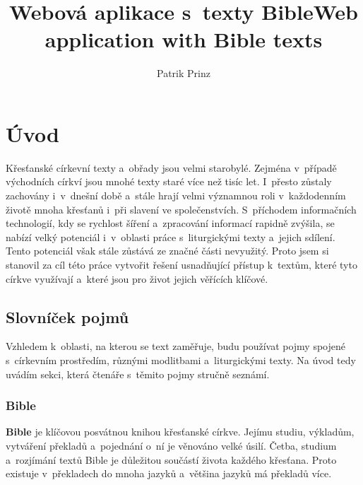 \documentclass[
  tables=false,
  glossaries,
  index
]{kidiplom}
\title{Webová aplikace s~texty Bible}
\title[english]{Web application with Bible texts}
\author{Patrik Prinz}
\begin{document}
\maketitle



\newcommand{\BibLaTeX}{\textsc{Bib}\LaTeX}


\section{Úvod}
Křesťanské církevní texty a~obřady jsou velmi starobylé. Zejména v~případě východních církví jsou mnohé texty staré více než tisíc let. I~přesto zůstaly zachovány i~v~dnešní době a~stále hrají velmi významnou roli v~každodenním životě mnoha křesťanů i~při slavení ve společenstvích. S~příchodem informačních technologií, kdy se rychlost šíření a~zpracování informací rapidně zvýšila, se nabízí velký potenciál i~v~oblasti práce s~liturgickými texty a~jejich sdílení. Tento potenciál však stále zůstává ze značné části nevyužitý. Proto jsem si stanovil za cíl této práce vytvořit řešení usnadňující přístup k~textům, které tyto církve využívají a~které jsou pro život jejich věřících klíčové.

\subsection{Slovníček pojmů}
Vzhledem k~oblasti, na kterou se text zaměřuje, budu používat pojmy spojené s~církevním prostředím, různými modlitbami a~liturgickými texty. Na úvod tedy uvádím sekci, která čtenáře s~těmito pojmy stručně seznámí.

\subsubsection{Bible}
\textbf{Bible} je klíčovou posvátnou knihou křesťanské církve. Jejímu studiu, výkladům, vytváření překladů a~pojednání o~ní je věnováno velké úsilí. Četba, studium a~rozjímání textů Bible je důležitou součástí života každého křesťana. Proto existuje v~překladech do mnoha jazyků a~většina jazyků má překladů více.
\end{document}
